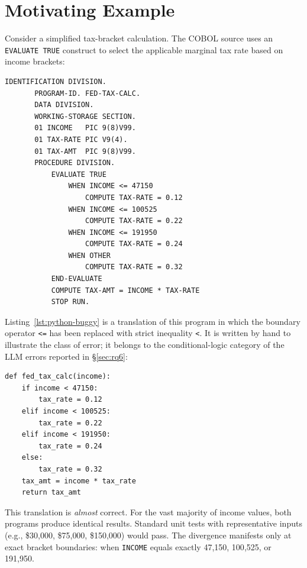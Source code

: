 \documentclass[sigconf,nonacm]{acmart}
\begin{document}
\section{Motivating Example}\label{sec:motivating}

Consider a simplified tax-bracket calculation. The COBOL source uses an \texttt{EVALUATE TRUE} construct to select the applicable marginal tax rate based on income brackets:

\begin{lstlisting}[style=cobolstyle,caption={COBOL tax bracket calculation using EVALUATE TRUE with $\leq$ boundaries.},label={lst:cobol-tax}]
       IDENTIFICATION DIVISION.
       PROGRAM-ID. FED-TAX-CALC.
       DATA DIVISION.
       WORKING-STORAGE SECTION.
       01 INCOME   PIC 9(8)V99.
       01 TAX-RATE PIC V9(4).
       01 TAX-AMT  PIC 9(8)V99.
       PROCEDURE DIVISION.
           EVALUATE TRUE
               WHEN INCOME <= 47150
                   COMPUTE TAX-RATE = 0.12
               WHEN INCOME <= 100525
                   COMPUTE TAX-RATE = 0.22
               WHEN INCOME <= 191950
                   COMPUTE TAX-RATE = 0.24
               WHEN OTHER
                   COMPUTE TAX-RATE = 0.32
           END-EVALUATE
           COMPUTE TAX-AMT = INCOME * TAX-RATE
           STOP RUN.
\end{lstlisting}

Listing~\ref{lst:python-buggy} is a translation of this program in which the boundary operator \texttt{<=} has been replaced with strict inequality \texttt{<}. It is written by hand to illustrate the class of error; it belongs to the conditional-logic category of the LLM errors reported in \S\ref{sec:rq6}:

\begin{lstlisting}[style=pythonstyle,caption={Python translation with a $<$ vs.\ $\leq$ boundary error (hand-written).},label={lst:python-buggy}]
def fed_tax_calc(income):
    if income < 47150:
        tax_rate = 0.12
    elif income < 100525:
        tax_rate = 0.22
    elif income < 191950:
        tax_rate = 0.24
    else:
        tax_rate = 0.32
    tax_amt = income * tax_rate
    return tax_amt
\end{lstlisting}

This translation is \emph{almost} correct. For the vast majority of income values, both programs produce identical results. Standard unit tests with representative inputs (e.g., \$30{,}000, \$75{,}000, \$150{,}000) would pass. The divergence manifests only at exact bracket boundaries: when \texttt{INCOME} equals exactly 47{,}150, 100{,}525, or 191{,}950.
\end{document}
